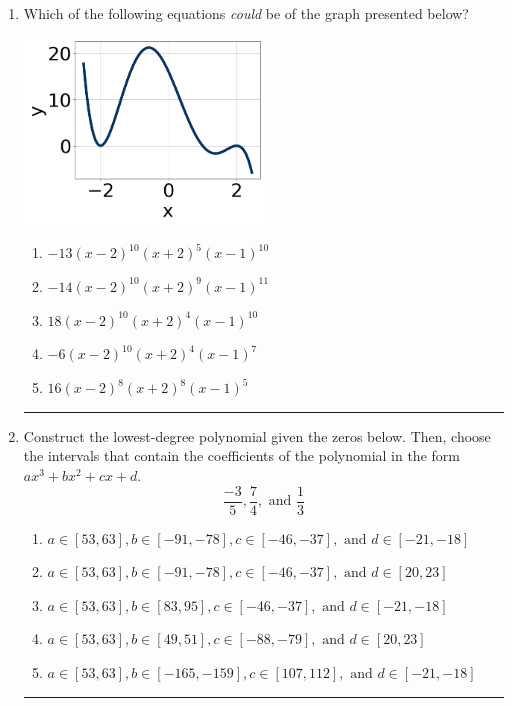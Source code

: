 \documentclass[14pt]{extbook}
\newcommand{\litem}[1]{\item#1\hspace*{-1cm}\rule{\textwidth}{0.4pt}}
\begin{document}
\begin{enumerate}
{\begin{enumerate}[label=\Alph*.]
\end{enumerate} }
\litem{
Which of the following equations \textit{could} be of the graph presented below?
\begin{center}
    \includegraphics[width=0.5\textwidth]{../Figures/polyGraphToFunctionC.png}
\end{center}
\begin{enumerate}[label=\Alph*.]
\item \( -13(x - 2)^{10} (x + 2)^{5} (x - 1)^{10} \)
\item \( -14(x - 2)^{10} (x + 2)^{9} (x - 1)^{11} \)
\item \( 18(x - 2)^{10} (x + 2)^{4} (x - 1)^{10} \)
\item \( -6(x - 2)^{10} (x + 2)^{4} (x - 1)^{7} \)
\item \( 16(x - 2)^{8} (x + 2)^{8} (x - 1)^{5} \)

\end{enumerate} }
\litem{
Construct the lowest-degree polynomial given the zeros below. Then, choose the intervals that contain the coefficients of the polynomial in the form $ax^3+bx^2+cx+d$.\[ \frac{-3}{5}, \frac{7}{4}, \text{ and } \frac{1}{3} \]\begin{enumerate}[label=\Alph*.]
\item \( a \in [53, 63], b \in [-91, -78], c \in [-46, -37], \text{ and } d \in [-21, -18] \)
\item \( a \in [53, 63], b \in [-91, -78], c \in [-46, -37], \text{ and } d \in [20, 23] \)
\item \( a \in [53, 63], b \in [83, 95], c \in [-46, -37], \text{ and } d \in [-21, -18] \)
\item \( a \in [53, 63], b \in [49, 51], c \in [-88, -79], \text{ and } d \in [20, 23] \)
\item \( a \in [53, 63], b \in [-165, -159], c \in [107, 112], \text{ and } d \in [-21, -18] \)


\end{enumerate}}
\end{enumerate}
\end{document}
